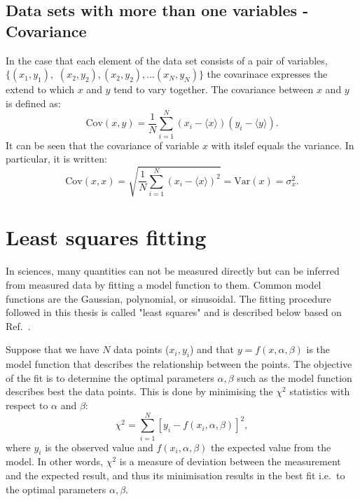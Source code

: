 \subsection{Data sets with more than one variables - Covariance}
In the case that each element of the data set consists of a pair of variables, $\{(x_1, y_1),$ $(x_2, y_2), (x_2, y_2), ...(x_N, y_N)\}$ the covarinace expresses the extend to which $x$ and $y$ tend to vary together. The covariance between $x$ and $y$ is defined as:
\begin{equation}\label{eq:cov_def}
    \mathrm{Cov}(x, y) = \frac{1}{N} \sum_{i=1}^{N} (x_i-\langle x \rangle) (y_i-\langle y \rangle).
\end{equation}
It can be seen that the covariance of variable $x$ with itslef equals the variance. In particular, it is written:
\begin{equation}\label{eq:std_var_cov_relationship}
    \mathrm{Cov}(x, x) = \sqrt{\frac{1}{N} \sum_{i=1}^{N} (x_i-\langle x \rangle)^2} = \mathrm{Var}(x) = \sigma_x^2.
\end{equation}

\section{Least squares fitting}\label{app:non_linear_fitting}
In sciences, many quantities can not be measured directly but can be inferred from measured data by fitting a model function to them. Common model functions are the Gaussian, polynomial, or sinusoidal. The fitting procedure followed in this thesis is called "least squares" and is described below based on Ref.~\cite{least_square_minimisation}.

Suppose that we have $N$ data points ($x_{i}, y_{i}$) and that $y=f(x,\alpha, \beta)$ is the model function that describes the relationship between the points. The objective of the fit is to determine the optimal parameters $\alpha, \beta$ such as the model function describes best the data points. This is done by minimising the $\chi^2$ statistics with respect to $\alpha$ and $\beta$:
\begin{equation}\label{eq:chi_square}
    \chi^2 = \sum_{i=1}^{N}[y_{i}-f(x_{i},\alpha, \beta)]^2,
\end{equation}
where $y_{i}$ is the observed value and $f(x_{i},\alpha, \beta)$ the expected value from the model. In other words, $\chi^2$ is a measure of deviation between the measurement and the expected result, and thus its minimisation results in the best fit i.e.\ to the optimal parameters $\alpha, \beta$.

